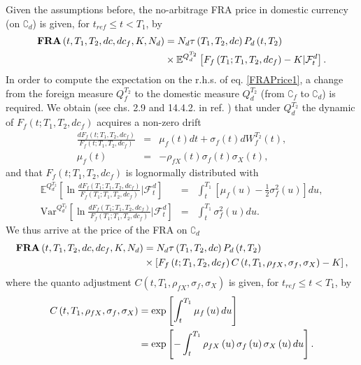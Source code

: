 \documentclass[11pt,reqno]{amsart}
\begin{document}
Given the assumptions before, the no-arbitrage FRA price in domestic
currency (on $\complement _{d}$) is given, for $t_{ref}\leq t<T_{1}$, by%
\begin{align}
\text{\textbf{FRA}}\left( t,T_{1},T_{2},dc,dc_{f},K,N_{d}\right) &
=N_{d}\tau \left( T_{1},T_{2},dc\right) P_{d}\left( t,T_{2}\right)  \notag \\
& \times \mathbb{E}^{Q_{d}^{T_{2}}}\left[ F_{f}\left(
T_{1};T_{1},T_{2},dc_{f}\right) -K|\mathcal{F}_{t}^{d}\right] .
\label{FRAPrice1}
\end{align}%
In order to compute the expectation on the r.h.s. of eq. \ref{FRAPrice1}, a
change from the foreign measure $Q_{f}^{T_{2}}$ to the domestic measure $%
Q_{d}^{T_{2}}$ (from $\complement _{f}$ to $\complement _{d}$) is required.
We obtain (see chs. 2.9 and 14.4.2. in ref. \cite{BrigoMercurio2006}) that
under $Q_{d}^{T_{2}}$ the dynamic of $F_{f}\left(
t;T_{1},T_{2},dc_{f}\right) $ acquires a non-zero drift 
\begin{eqnarray}
\frac{dF_{f}\left( t;T_{1},T_{2},dc_{f}\right) }{F_{f}\left(
t;T_{1},T_{2},dc_{f}\right) } &=&\mu _{f}\left( t\right) dt+\sigma
_{f}\left( t\right) dW_{f}^{T_{2}}\left( t\right) , \\
\mu _{f}\left( t\right) &=&-\rho _{fX}\left( t\right) \sigma _{f}\left(
t\right) \sigma _{X}\left( t\right) ,
\end{eqnarray}%
and that $F_{f}\left( t;T_{1},T_{2},dc_{f}\right) $ is lognormally
distributed with 
\begin{eqnarray}
\mathbb{E}^{Q_{d}^{T_{2}}}\left[ \ln \frac{dF_{f}\left(
T_{1};T_{1},T_{2},dc_{f}\right) }{F_{f}\left(
T_{1};T_{1},T_{2},dc_{f}\right) }|\mathcal{F}_{t}^{d}\right]
&=&\int_{t}^{T_{1}}\left[ \mu _{f}\left( u\right) -\frac{1}{2}\sigma
_{f}^{2}\left( u\right) \right] du, \\
\text{Var}^{Q_{d}^{T_{2}}}\left[ \ln \frac{dF_{f}\left(
T_{1};T_{1},T_{2},dc_{f}\right) }{F_{f}\left(
T_{1};T_{1},T_{2},dc_{f}\right) }|\mathcal{F}_{t}^{d}\right]
&=&\int_{t}^{T_{1}}\sigma _{f}^{2}\left( u\right) du.
\end{eqnarray}%
We thus arrive at the price of the FRA on $\complement _{d}$%
\begin{align}
\text{\textbf{FRA}}\left( t,T_{1},T_{2},dc,dc_{f},K,N_{d}\right) &
=N_{d}\tau \left( T_{1},T_{2},dc\right) P_{d}\left( t,T_{2}\right)  \notag \\
& \times \left[ F_{f}\left( t;T_{1},T_{2},dc_{f}\right) C\left( t,T_{1},\rho
_{fX},\sigma _{f},\sigma _{X}\right) -K\right] ,  \label{FRAPrice2}
\end{align}%
where the quanto adjustment $C\left( t,T_{1},\rho _{fX},\sigma _{f},\sigma
_{X}\right) $ is given, for $t_{ref}\leq t<T_{1}$, by%
\begin{align}
C\left( t,T_{1},\rho _{fX},\sigma _{f},\sigma _{X}\right) & =\exp \left[
\int_{t}^{T_{1}}\mu _{f}\left( u\right) du\right]  \notag \\
& =\exp \left[ -\int_{t}^{T_{1}}\rho _{fX}\left( u\right) \sigma _{f}\left(
u\right) \sigma _{X}\left( u\right) du\right] .  \label{QuantoAdj}
\end{align}
\end{document}
